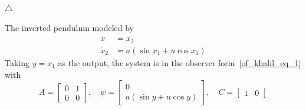 \documentclass[12pt,a4paper,oneside]{book}
\begin{document}
\begin{onehalfspace}
\begin{example}
	\hfill$\triangle$
\end{example}
\begin{example} The inverted pendulum modeled by
	\begin{equation*} 
		\begin{aligned}
			\dot{x} &= x_2 \\[6pt]
			\dot{x}_2 &= a(\sin x_1 + u\cos x_1)
		\end{aligned}
	\end{equation*}
Taking $y=x_1$ as the output, the system is in the observer form~\eqref{of_khalil_eq_1} with
\begin{equation*} 
	A=\begin{bmatrix} 0&1 \\[6pt] 0&0 \end{bmatrix},\quad\psi=\begin{bmatrix} 0 \\[6pt] a(\sin y + u\cos y)\end{bmatrix}, \quad C=\begin{bmatrix} 1&0
	\end{bmatrix}
\end{equation*} 


\end{example}
\end{onehalfspace}
\end{document}
